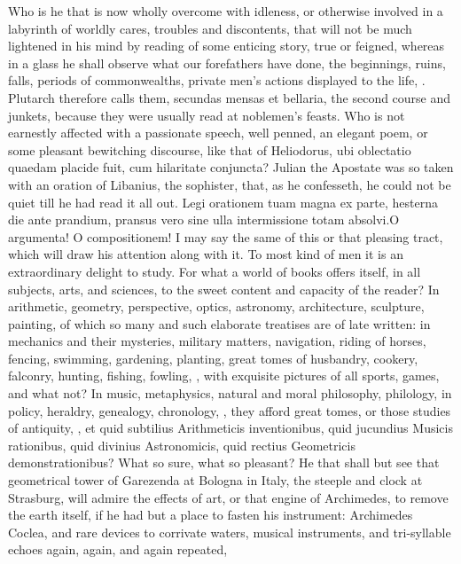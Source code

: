 {Who is he that is now wholly overcome with idleness, or otherwise
involved in a labyrinth of worldly cares, troubles and discontents,
that will not be much lightened in his mind by reading of some enticing
story, true or feigned, whereas in a glass he shall observe what our
forefathers have done, the beginnings, ruins, falls, periods of
commonwealths, private men's actions displayed to the life, \etc{}. 
Plutarch therefore calls them, secundas mensas et bellaria, the second
course and junkets, because they were usually read at noblemen's
feasts. Who is not earnestly affected with a passionate speech, well
penned, an elegant poem, or some pleasant bewitching discourse, like
that of  Heliodorus, ubi oblectatio quaedam placide fuit, cum
hilaritate conjuncta? Julian the Apostate was so taken with an oration
of Libanius, the sophister, that, as he confesseth, he could not be
quiet till he had read it all out. Legi orationem tuam magna ex parte,
hesterna die ante prandium, pransus vero sine ulla intermissione totam
absolvi.O argumenta! O compositionem! I may say the same of this
or that pleasing tract, which will draw his attention along with it. To
most kind of men it is an extraordinary delight to study. For what a
world of books offers itself, in all subjects, arts, and sciences, to
the sweet content and capacity of the reader? In arithmetic, geometry,
perspective, optics, astronomy, architecture, sculpture, painting, of
which so many and such elaborate treatises are of late written: in
mechanics and their mysteries, military matters, navigation,
riding of horses, fencing, swimming, gardening, planting,
great tomes of husbandry, cookery, falconry, hunting, fishing, fowling,
\etc{}, with exquisite pictures of all sports, games, and what not? In
music, metaphysics, natural and moral philosophy, philology, in policy,
heraldry, genealogy, chronology, \etc{}, they afford great tomes, or those
studies of antiquity, \etc{}, et quid subtilius Arithmeticis
inventionibus, quid jucundius Musicis rationibus, quid divinius
Astronomicis, quid rectius Geometricis demonstrationibus? What so sure,
what so pleasant? He that shall but see that geometrical tower of
Garezenda at Bologna in Italy, the steeple and clock at Strasburg, will
admire the effects of art, or that engine of Archimedes, to remove the
earth itself, if he had but a place to fasten his instrument:
Archimedes Coclea, and rare devices to corrivate waters, musical
instruments, and tri-syllable echoes again, again, and again repeated,
}
